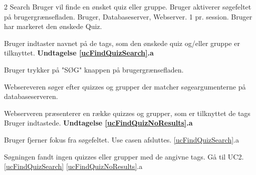 \uchead
	{2}
	{Search}
	{Bruger vil finde en ønsket quiz eller gruppe.}
	{Bruger aktiverer søgefeltet på brugergrænsefladen.}
	{Bruger, Databaseserver, Webserver.}
	{}
	{1 pr. session.}
	{Bruger har markeret den ønskede Quiz.}

\item \label{ucFindQuizSearch} Bruger indtaster navnet på de tags, som den ønskede quiz og/eller gruppe er tilknyttet. 
\textbf{Undtagelse \ref{ucFindQuizSearch}.a}
\item Bruger trykker på "SØG" knappen på brugergrænsefladen.
\item Websereveren søger efter quizzes og grupper der matcher søgeargumenterne på databaseserveren.

\item \label{ucFindQuizNoResults} Webserveren præsenterer en række quizzes og grupper, som er tilknyttet de tags Bruger indtastede.
\textbf{Undtagelse \ref{ucFindQuizNoResults}.a}


\ucdescriptionend

\ucextension
	{Bruger fjerner fokus fra søgefeltet.}
	{Use casen afsluttes.}
	{\ref{ucFindQuizSearch}.a}

\ucextension
	{Søgningen fandt ingen quizzes eller grupper med de angivne tags.}
	{Gå til UC2.\ref{ucFindQuizSearch}}
	{\ref{ucFindQuizNoResults}.a}
				
